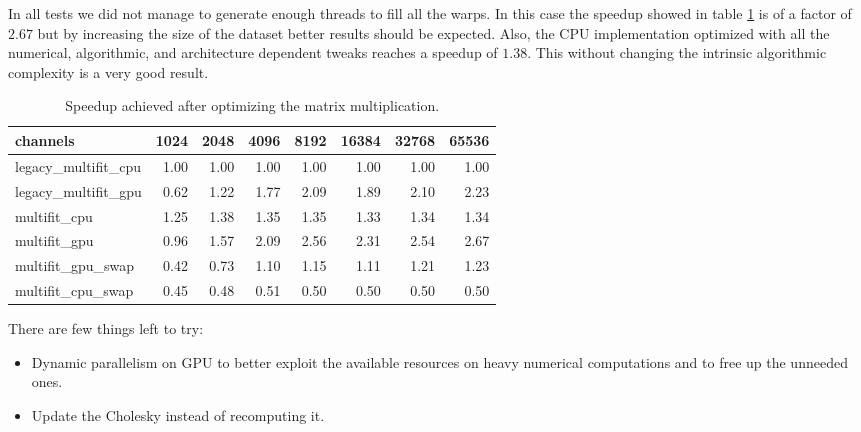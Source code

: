 In all tests we did not manage to generate enough threads to fill all the warps. In this case the speedup showed in table \ref{tab:speedup} is of a factor of $\bm{2.67}$ but by increasing the size of the dataset better results should be expected. Also, the CPU implementation optimized with all the numerical, algorithmic, and architecture dependent tweaks reaches a speedup of $\bm{1.38}$. This without changing the intrinsic algorithmic complexity is a very good result.\\
\begin{table}[H]
  \caption{Speedup achieved after optimizing the matrix multiplication.}
  \label{tab:speedup}
\begin{tabular}{lrrrrrrr}
\toprule
channels &  1024  &  2048  &  4096  &  8192  &  16384 &  32768 &  65536 \\
\midrule
legacy\_multifit\_cpu &   1.00 &   1.00 &   1.00 &   1.00 &   1.00 &   1.00 &   1.00 \\
legacy\_multifit\_gpu &   0.62 &   1.22 &   1.77 &   2.09 &   1.89 &   2.10 &   2.23 \\
multifit\_cpu        &   1.25 &   1.38 &   1.35 &   1.35 &   1.33 &   1.34 &   1.34 \\
multifit\_gpu        &   0.96 &   1.57 &   2.09 &   2.56 &   2.31 &   2.54 &   2.67 \\
multifit\_gpu\_swap   &   0.42 &   0.73 &   1.10 &   1.15 &   1.11 &   1.21 &   1.23 \\
multifit\_cpu\_swap   &   0.45 &   0.48 &   0.51 &   0.50 &   0.50 &   0.50 &   0.50 \\
\bottomrule
\end{tabular}
\end{table}
There are few things left to try:
\begin{itemize}
  \item Dynamic parallelism on GPU to better exploit the available resources on heavy numerical computations and to free up the unneeded ones.
  \item Update the Cholesky instead of recomputing it.

\end{itemize}